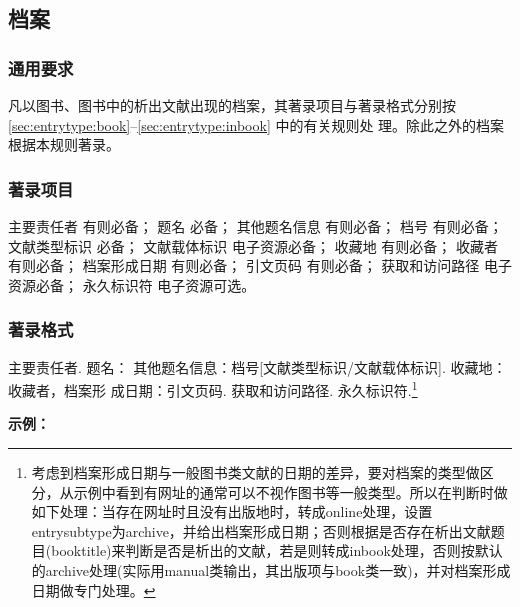 \documentclass[twoside]{article}%
\begin{document}
\subsection{档案}\label{sec:entrytype:archive}

\subsubsection{通用要求}

凡以图书、图书中的析出文献出现的档案，其著录项目与著录格式分别按 \ref{sec:entrytype:book}--\ref{sec:entrytype:inbook} 中的有关规则处
理。除此之外的档案根据本规则著录。

\subsubsection{著录项目}

主要责任者 有则必备；
题名 必备；
其他题名信息 有则必备；
档号 有则必备；
文献类型标识 必备；
文献载体标识 电子资源必备；
收藏地 有则必备；
收藏者 有则必备；
档案形成日期 有则必备；
引文页码 有则必备；
获取和访问路径 电子资源必备；
永久标识符 电子资源可选。

\subsubsection{著录格式}

主要责任者. 题名： 其他题名信息：档号[文献类型标识/文献载体标识]. 收藏地： 收藏者，档案形
成日期：引文页码. 获取和访问路径. 永久标识符.\footnote{考虑到档案形成日期与一般图书类文献的日期的差异，要对档案的类型做区分，从示例中看到有网址的通常可以不视作图书等一般类型。所以在判断时做如下处理：当存在网址时且没有出版地时，转成online处理，设置entrysubtype为archive，并给出档案形成日期；否则根据是否存在析出文献题目(booktitle)来判断是否是析出的文献，若是则转成inbook处理，否则按默认的archive处理(实际用manual类输出，其出版项与book类一致)，并对档案形成日期做专门处理。}



\begin{refsection}
\nocite{李鸿章1887,湖北省建设厅1931,武汉市军事管制委员会1949,FITZWILLIAM1570,
中国第一历史档案馆2001--,清代奏折汇编2005,私立武昌2021}


\textbf{示例：}

{\printbibliography[heading=none,env=indentegenv]}

\end{refsection}
\end{document}
